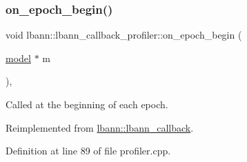 \subsubsection{\texorpdfstring{on\+\_\+epoch\+\_\+begin()}{on\_epoch\_begin()}}
{\footnotesize\ttfamily void lbann\+::lbann\+\_\+callback\+\_\+profiler\+::on\+\_\+epoch\+\_\+begin (\begin{DoxyParamCaption}\item[{\hyperlink{classlbann_1_1model}{model} $\ast$}]{m }\end{DoxyParamCaption})\hspace{0.3cm}{\ttfamily [override]}, {\ttfamily [virtual]}}

Called at the beginning of each epoch. 

Reimplemented from \hyperlink{classlbann_1_1lbann__callback_a4ed9498763412a55953fff71ee3a9456}{lbann\+::lbann\+\_\+callback}.



Definition at line 89 of file profiler.\+cpp.


